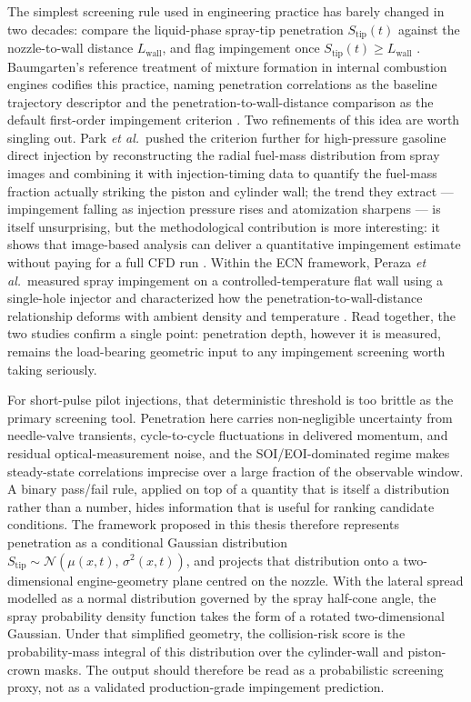 \documentclass[english, 12pt, a4paper, elec, utf8, a-2b, online]{aaltothesis}
\begin{document}
The simplest screening rule used in engineering practice has barely changed in two decades: 
compare the liquid-phase spray-tip penetration $S_\mathrm{tip}(t)$ against the nozzle-to-wall distance $L_\mathrm{wall}$, 
and flag impingement once $S_\mathrm{tip}(t) \geq L_\mathrm{wall}$ \cite{Baumgarten2006MixFormation}. 
Baumgarten's reference treatment of mixture formation in internal combustion engines codifies this practice, 
naming penetration correlations as the baseline trajectory descriptor and the penetration-to-wall-distance comparison 
as the default first-order impingement criterion \cite{Baumgarten2006MixFormation}. 
Two refinements of this idea are worth singling out. 
Park \textit{et al.}\ pushed the criterion further for high-pressure gasoline direct injection by reconstructing the radial fuel-mass distribution 
from spray images and combining it with injection-timing data to quantify the fuel-mass fraction actually striking the piston and cylinder wall; 
the trend they extract --- impingement falling as injection pressure rises and atomization sharpens --- is itself unsurprising, 
but the methodological contribution is more interesting: 
it shows that image-based analysis can deliver a quantitative impingement estimate without paying for a full CFD run \cite{Park2018WallImpingement}. 
Within the ECN framework, Peraza \textit{et al.}\ measured spray impingement on a controlled-temperature flat wall 
using a single-hole injector and characterized how the penetration-to-wall-distance relationship deforms with ambient density and temperature 
\cite{peraza2022swi}. 
Read together, the two studies confirm a single point: 
penetration depth, however it is measured, remains the load-bearing geometric input to any impingement screening worth taking seriously.

For short-pulse pilot injections, that deterministic threshold is too brittle as the primary screening tool. 
Penetration here carries non-negligible uncertainty from needle-valve transients, 
cycle-to-cycle fluctuations in delivered momentum, and residual optical-measurement noise, 
and the SOI/EOI-dominated regime makes steady-state correlations imprecise over a large fraction of the observable window. 
A binary pass/fail rule, applied on top of a quantity that is itself a distribution rather than a number, 
hides information that is useful for ranking candidate conditions. 
The framework proposed in this thesis therefore represents penetration as a conditional Gaussian distribution 
$S_\mathrm{tip}\sim\mathcal{N}(\mu(x,t),\,\sigma^2(x,t))$, 
and projects that distribution onto a two-dimensional engine-geometry plane centred on the nozzle. 
With the lateral spread modelled as a normal distribution governed by the spray half-cone angle, 
the spray probability density function takes the form of a rotated two-dimensional Gaussian. 
Under that simplified geometry, the collision-risk score is the probability-mass integral of this distribution over the cylinder-wall and piston-crown masks. 
The output should therefore be read as a probabilistic screening proxy, not as a validated production-grade impingement prediction.
\end{document}
